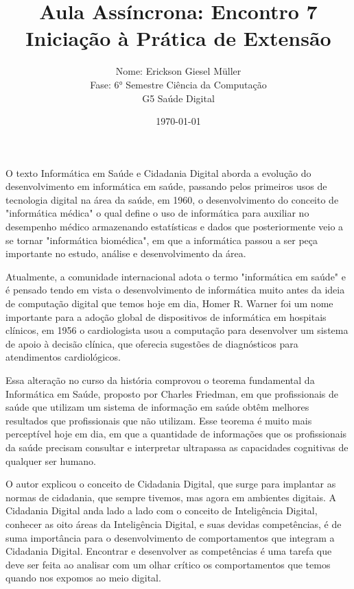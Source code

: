 \documentclass[12pt, a4paper]{article}
\title{Aula Assíncrona: Encontro 7\\Iniciação à Prática de Extensão}
\author{Nome: Erickson Giesel Müller
\\ Fase: 6° Semestre Ciência da Computação
\\ G5 Saúde Digital}
\date{\today}
\begin{document}
\maketitle
\thispagestyle{empty} %

O texto Informática em Saúde e Cidadania Digital aborda a evolução do desenvolvimento em informática em saúde, passando pelos primeiros usos de tecnologia digital na área da saúde, em 1960, o desenvolvimento do conceito de "informática médica" o qual define o uso de informática para auxiliar no desempenho médico armazenando estatísticas e dados que posteriormente veio a se tornar "informática biomédica", em que a informática passou a ser peça importante no estudo, análise e desenvolvimento da área.

Atualmente, a comunidade internacional adota o termo "informática em saúde" e é pensado tendo em vista o desenvolvimento de informática muito antes da ideia de computação digital que temos hoje em dia, Homer R. Warner foi um nome importante para a adoção global de dispositivos de informática em hospitais clínicos, em 1956 o cardiologista usou a computação para desenvolver um sistema de apoio à decisão clínica, que oferecia sugestões de diagnósticos para atendimentos cardiológicos.

Essa alteração no curso da história comprovou o teorema fundamental da Informática em Saúde, proposto por Charles Friedman, em que profissionais de saúde que utilizam um sistema de informação em saúde obtêm melhores resultados que profissionais que não utilizam. Esse teorema é muito mais perceptível hoje em dia, em que a quantidade de informações que os profissionais da saúde precisam consultar e interpretar ultrapassa as capacidades cognitivas de qualquer ser humano.

O autor explicou o conceito de Cidadania Digital, que surge para implantar as normas de cidadania, que sempre tivemos, mas agora em ambientes digitais. A Cidadania Digital anda lado a lado com o conceito de Inteligência Digital, conhecer as oito áreas da Inteligência Digital, e suas devidas competências, é de suma importância para o desenvolvimento de comportamentos que integram a Cidadania Digital. Encontrar e desenvolver as competências é uma tarefa que deve ser feita ao analisar com um olhar crítico os comportamentos que temos quando nos expomos ao meio digital.
\end{document}
